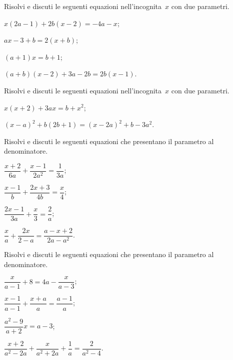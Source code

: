\begin{esercizio}[\Ast]
\label{ese:20.42}
Risolvi e discuti le seguenti equazioni nell'incognita~$x$ con due parametri.
\begin{multicols}{2}
\begin{enumeratea}
 \item $x(2a-1)+2b(x-2)=-4a-x$;
 \item $ax-3+b=2(x+b)$;
 \item $(a+1)x=b+1$;
 \item $(a+b)(x-2)+3a-2b=2b(x-1)$.
\end{enumeratea}
\end{multicols}
\end{esercizio}

\begin{esercizio}[\Ast]
\label{ese:20.43}
Risolvi e discuti le seguenti equazioni nell'incognita~$x$ con due parametri.
\begin{enumeratea}
 \item $x(x+2)+3ax=b+x^{2}$;
 \item $(x-a)^{2}+b(2b+1)=(x-2a)^{2}+b-3a^{2}$.
\end{enumeratea}
\end{esercizio}

\begin{esercizio}[\Ast]
\label{ese:20.44}
Risolvi e discuti le seguenti equazioni che presentano il parametro al denominatore.
\begin{multicols}{2}
\begin{enumeratea}
 \item $\dfrac{x+2}{6a}+\dfrac{x-1}{2a^{2}}=\dfrac{1}{3a}$;
 \item $\dfrac{x-1}{b}+\dfrac{2x+3}{4b}=\dfrac{x}{4}$;
 \item $\dfrac{2x-1}{3a}+\dfrac{x}{3}=\dfrac{2}{a}$;
 \item $\dfrac{x}{a}+\dfrac{2x}{2-a}=\dfrac{a-x+2}{2a-a^{2}}$.
\end{enumeratea}
\end{multicols}
\end{esercizio}

\begin{esercizio}[\Ast]
\label{ese:20.45}
Risolvi e discuti le seguenti equazioni che presentano il parametro al denominatore.
\begin{multicols}{2}
\begin{enumeratea}
 \item $\dfrac{x}{a-1}+8=4a-\dfrac{x}{a-3}$;
 \item $\dfrac{x-1}{a-1}+\dfrac{x+a}{a}=\dfrac{a-1}{a}$;
 \item $\dfrac{a^{2}-9}{a+2}x=a-3$;
 \item $\dfrac{x+2}{a^{2}-2a}+\dfrac{x}{a^{2}+2a}+\dfrac{1}{a}=\dfrac{2}{a^{2}-4}$.
\end{enumeratea}
\end{multicols}
\end{esercizio}

